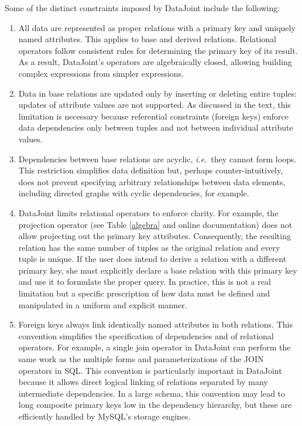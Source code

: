 \documentclass[10pt,letterpaper]{article}
\begin{document}
Some of the distinct constraints imposed by DataJoint include the following:
\begin{enumerate}

\item
All data are represented as proper relations with a primary key and uniquely named attributes. 
This applies to base and derived relations. 
Relational operators follow consistent rules for determining the primary key of its result. 
As a result, DataJoint's operators are algebraically closed, allowing building complex expressions from simpler expressions.

\item
Data in base relations are updated only by inserting or deleting entire tuples: updates of attribute values are not supported.
As discussed in the text, this limitation is necessary because referential constraints (foreign keys) enforce data dependencies only between tuples and not between individual attribute values. 

\item 
Dependencies between base relations are acyclic, \emph{i.e.}\ they cannot form loops. 
This restriction simplifies data definition but, perhaps counter-intuitively, does not prevent specifying arbitrary relationships between data elements, including directed graphs with cyclic dependencies, for example.

\item
DataJoint limits relational operators to enforce clarity.
For example, the projection operator (see Table \ref{algebra} and online documentation) does not allow projecting out the primary key attributes.
Consequently, the resulting relation has the same number of tuples as the original relation and every tuple is unique.
If the user does intend to derive a relation with a different primary key, she must explicitly declare a base relation with this primary key and use it to formulate the proper query.
In practice, this is not a real limitation but a specific prescription of how data must be defined and manipulated in a uniform and explicit manner.

\item
Foreign keys always link identically named attributes in both relations.
This convention simplifies the specification of dependencies and of relational operators.
For example, a single join operator in DataJoint can perform the same work as the multiple forms and parameterizations of the JOIN operators in SQL.
This convention is particularly important in DataJoint because it allows direct logical linking of relations separated by many intermediate dependencies.
In a large schema, this convention may lead to long composite primary keys low in the dependency hierarchy, but these are efficiently handled by MySQL's storage engines.

\end{enumerate}
\end{document}
